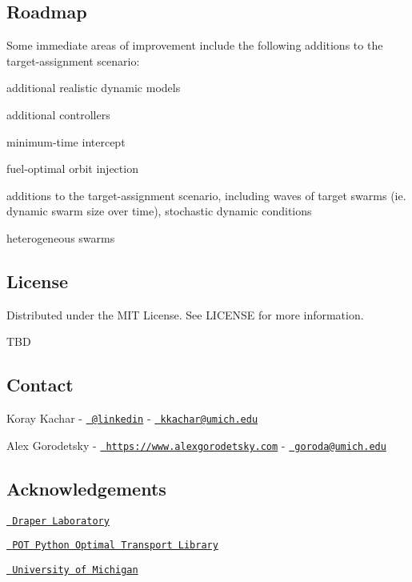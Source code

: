 \subsection*{Roadmap}

Some immediate areas of improvement include the following additions to the target-\/assignment scenario\+:
\begin{DoxyItemize}
\item additional realistic dynamic models
\item additional controllers
\begin{DoxyItemize}
\item minimum-\/time intercept
\item fuel-\/optimal orbit injection
\end{DoxyItemize}
\item additions to the target-\/assignment scenario, including waves of target swarms (ie. dynamic swarm size over time), stochastic dynamic conditions
\item heterogeneous swarms
\end{DoxyItemize}

\subsection*{License}

Distributed under the M\+IT License. See {\ttfamily L\+I\+C\+E\+N\+SE} for more information.

T\+BD

\subsection*{Contact}


\begin{DoxyItemize}
\item Koray Kachar -\/ \href{https://www.linkedin.com/in/koray-kachar/}{\texttt{ @linkedin}} -\/ \href{mailto:kkachar@umich.edu}{\texttt{ kkachar@umich.\+edu}}
\item Alex Gorodetsky -\/ \href{https://www.alexgorodetsky.com}{\texttt{ https\+://www.\+alexgorodetsky.\+com}} -\/ \href{mailto:goroda@umich.edu}{\texttt{ goroda@umich.\+edu}}
\end{DoxyItemize}

\subsection*{Acknowledgements}


\begin{DoxyItemize}
\item \href{https://www.draper.com}{\texttt{ Draper Laboratory}}
\item \href{https://github.com/rflamary/POT}{\texttt{ P\+OT Python Optimal Transport Library}}
\item \href{https://aero.engin.umich.edu}{\texttt{ University of Michigan}} 
\end{DoxyItemize}